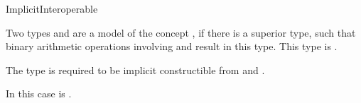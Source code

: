 \begin{ccRefConcept}{ImplicitInteroperable}
\ccDefinition

Two types  and  are a model of the concept 
, if there is a superior type, such that 
binary arithmetic operations involving  and  result in 
this type. This type is . 

The type  is required to be 
implicit constructible from  and . 


In this case  
is .


\ccRefines
 
\ccSeeAlso
{}\\
\\
\\
\\

\end{ccRefConcept}
